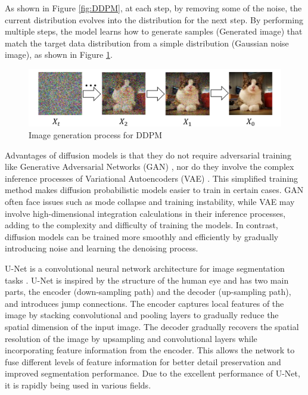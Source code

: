 \documentclass[12pt]{report}
\begin{document}
As shown in Figure \ref{fig:DDPM}, at each step, by removing some of the noise, the current distribution evolves into the distribution for the next step. By performing multiple steps, the model learns how to generate samples (Generated image) that match the target data distribution from a simple distribution (Gaussian noise image), as shown in Figure \ref{fig:DDPM1}.
\begin{figure}[h]
    \centering
    \includegraphics[width=14cm]{image/DDPM1.pdf}
    \caption{Image generation process for DDPM}
    \label{fig:DDPM1}
\end{figure}

Advantages of diffusion models is that they do not require adversarial training like Generative Adversarial Networks (GAN) \cite{goodfellow2020generative}, nor do they involve the complex inference processes of Variational Autoencoders (VAE) \cite{kingma2013auto}. This simplified training method makes diffusion probabilistic models easier to train in certain cases. GAN often face issues such as mode collapse and training instability, while VAE may involve high-dimensional integration calculations in their inference processes, adding to the complexity and difficulty of training the models. In contrast, diffusion models can be trained more smoothly and efficiently by gradually introducing noise and learning the denoising process.

U-Net is a convolutional neural network architecture for image segmentation tasks \cite{ronneberger2015u}. U-Net is inspired by the structure of the human eye and has two main parts, the encoder (down-sampling path) and the decoder (up-sampling path), and introduces jump connections. The encoder captures local features of the image by stacking convolutional and pooling layers to gradually reduce the spatial dimension of the input image. The decoder gradually recovers the spatial resolution of the image by upsampling and convolutional layers while incorporating feature information from the encoder. This allows the network to fuse different levels of feature information for better detail preservation and improved segmentation performance. Due to the excellent performance of U-Net, it is rapidly being used in various fields.
\end{document}
